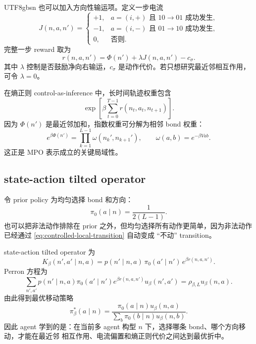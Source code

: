 \documentclass[11pt]{article}
\begin{document}
\begin{CJK*}{UTF8}{gbsn}
也可以加入方向性输运项。定义一步电流
\begin{equation}
    J(n,a,n')
    =
    \begin{cases}
        +1, & a=(i,+)\text{ 且 }10\to 01\text{ 成功发生},\\
        -1, & a=(i,-)\text{ 且 }01\to 10\text{ 成功发生},\\
        0, & \text{否则}.
    \end{cases}
\end{equation}
完整一步 reward 取为
\begin{equation}
    r(n,a,n')
    =
    \Phi(n')
    +
    \lambda J(n,a,n')
    -
    c_\sigma.
    \label{eq:nn-reward}
\end{equation}
其中 \(\lambda\) 控制是否鼓励净向右输运，\(c_\sigma\) 是动作代价。若只想研究最近邻相互作用，
可令 \(\lambda=0\)。

在熵正则 control-as-inference 中，长时间轨迹权重包含
\begin{equation}
    \exp\left[
        \beta
        \sum_{t=0}^{T-1}
        r(n_t,a_t,n_{t+1})
    \right].
\end{equation}
因为 \(\Phi(n')\) 是最近邻加和，指数权重可分解为相邻 bond 权重：
\begin{equation}
    e^{\beta\Phi(n')}
    =
    \prod_{k=1}^{L-1}
    \omega(n_k',n_{k+1}'),
    \qquad
    \omega(a,b)=e^{-\beta Vab}.
    \label{eq:nn-boltzmann-factor}
\end{equation}
这正是 MPO 表示成立的关键局域性。

\subsection{state-action tilted operator}

令 prior policy 为均匀选择 bond 和方向：
\begin{equation}
    \pi_0(a\mid n)
    =
    \frac{1}{2(L-1)}.
    \label{eq:uniform-prior}
\end{equation}
也可以把非法动作排除在 prior 之外，但均匀选择所有动作更简单，因为非法动作已经通过
\eqref{eq:controlled-local-transition} 自动变成 ``不动'' transition。

state-action tilted operator 为
\begin{equation}
    K_\beta(n',a'\mid n,a)
    =
    p(n'\mid n,a)\,
    \pi_0(a'\mid n')\,
    e^{\beta r(n,a,n')}.
    \label{eq:concrete-tilted-operator}
\end{equation}
Perron 方程为
\begin{equation}
    \sum_{n',a'}
    p(n'\mid n,a)\pi_0(a'\mid n')
    e^{\beta r(n,a,n')}
    u_\beta(n',a')
    =
    \rho_{\beta,L}u_\beta(n,a).
    \label{eq:concrete-perron}
\end{equation}
由此得到最优移动策略
\begin{equation}
    \pi_\beta^*(a\mid n)
    =
    \frac{\pi_0(a\mid n)u_\beta(n,a)}
    {\sum_b\pi_0(b\mid n)u_\beta(n,b)}.
    \label{eq:concrete-policy}
\end{equation}
因此 agent 学到的是：在当前多 agent 构型 \(n\) 下，选择哪条 bond、哪个方向移动，才能在最近邻
相互作用、电流偏置和熵正则代价之间达到最优折中。


\end{CJK*}
\end{document}
